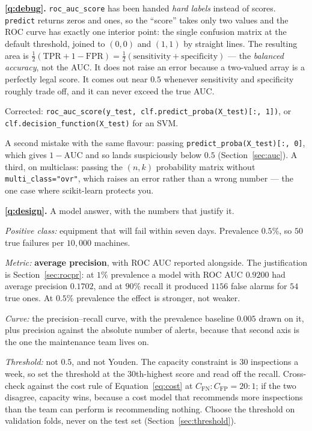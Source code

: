 \documentclass[11pt]{article}
\newcommand{\FP}{\mathrm{FP}}
\newcommand{\FN}{\mathrm{FN}}
\newcommand{\TPR}{\mathrm{TPR}}
\newcommand{\FPR}{\mathrm{FPR}}
\begin{document}
\medskip
\textbf{\ref{q:debug}.} \texttt{roc\_auc\_score} has been handed \emph{hard
labels} instead of scores. \texttt{predict} returns zeros and ones, so the
``score'' takes only two values and the ROC curve has exactly one interior
point: the single confusion matrix at the default threshold, joined to $(0,0)$
and $(1,1)$ by straight lines. The resulting area is
$\tfrac{1}{2}(\TPR + 1 - \FPR) = \tfrac{1}{2}(\text{sensitivity} +
\text{specificity})$ --- the \emph{balanced accuracy}, not the AUC. It does not
raise an error because a two-valued array is a perfectly legal score. It comes
out near $0.5$ whenever sensitivity and specificity roughly trade off, and it
can never exceed the true AUC.

Corrected: \texttt{roc\_auc\_score(y\_test, clf.predict\_proba(X\_test)[:, 1])},
or \texttt{clf.decision\_function(X\_test)} for an SVM.

A second mistake with the same flavour: passing
\texttt{predict\_proba(X\_test)[:, 0]}, which gives $1 - \mathrm{AUC}$ and so
lands suspiciously below $0.5$ (Section~\ref{sec:auc}). A third, on multiclass:
passing the $(n, k)$ probability matrix without \texttt{multi\_class="ovr"},
which raises an error rather than a wrong number --- the one case where
scikit-learn protects you.

\medskip
\textbf{\ref{q:design}.} A model answer, with the numbers that justify it.

\emph{Positive class:} equipment that will fail within seven days. Prevalence
$0.5\%$, so $50$ true failures per $10{,}000$ machines.

\emph{Metric:} \textbf{average precision}, with ROC AUC reported alongside. The
justification is Section~\ref{sec:rocpr}: at $1\%$ prevalence a model with ROC
AUC $0.9200$ had average precision $0.1702$, and at $90\%$ recall it produced
$1156$ false alarms for $54$ true ones. At $0.5\%$ prevalence the effect is
stronger, not weaker.

\emph{Curve:} the precision--recall curve, with the prevalence baseline
$0.005$ drawn on it, plus precision against the absolute number of alerts,
because that second axis is the one the maintenance team lives on.

\emph{Threshold:} not $0.5$, and not Youden. The capacity constraint is $30$
inspections a week, so set the threshold at the $30$th-highest score and read off
the recall. Cross-check against the cost rule of Equation~\eqref{eq:cost} at
$C_{\FN}\!:\!C_{\FP} = 20\!:\!1$; if the two disagree, capacity wins, because a
cost model that recommends more inspections than the team can perform is
recommending nothing. Choose the threshold on validation folds, never on the
test set (Section~\ref{sec:threshold}).
\end{document}

